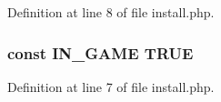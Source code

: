 Definition at line 8 of file install.\+php.

\hypertarget{install_8php_a12c82f3d28569a3f80804f1e72cef14c}{
\subsubsection[{I\+N\+\_\+\+G\+A\+M\+E}]{\setlength{\rightskip}{0pt plus 5cm}const I\+N\+\_\+\+G\+A\+M\+E T\+R\+U\+E}}\label{install_8php_a12c82f3d28569a3f80804f1e72cef14c}


Definition at line 7 of file install.\+php.

